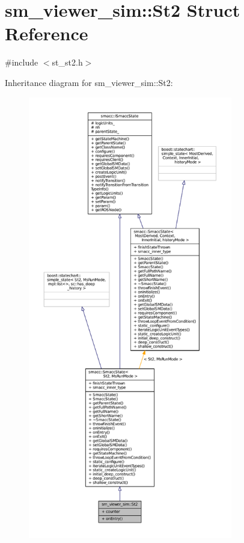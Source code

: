 \hypertarget{structsm__viewer__sim_1_1St2}{}\section{sm\+\_\+viewer\+\_\+sim\+:\+:St2 Struct Reference}
\label{structsm__viewer__sim_1_1St2}


{\ttfamily \#include $<$st\+\_\+st2.\+h$>$}



Inheritance diagram for sm\+\_\+viewer\+\_\+sim\+:\+:St2\+:
\nopagebreak
\begin{figure}[H]
\begin{center}
\leavevmode
\includegraphics[height=550pt]{structsm__viewer__sim_1_1St2__inherit__graph}
\end{center}
\end{figure}


